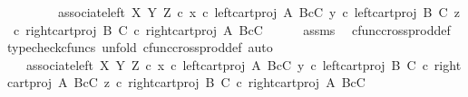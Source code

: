 \begin{isabellebody}
\ \ \ \ \ \ \ \ associate{\isacharunderscore}{\kern0pt}left\ X\ Y\ Z\ {\isasymcirc}\isactrlsub c\ {\isasymlangle}x\ {\isasymcirc}\isactrlsub c\ left{\isacharunderscore}{\kern0pt}cart{\isacharunderscore}{\kern0pt}proj\ A\ {\isacharparenleft}{\kern0pt}B{\isasymtimes}\isactrlsub cC{\isacharparenright}{\kern0pt}{\isacharcomma}{\kern0pt}\ {\isasymlangle}y\ {\isasymcirc}\isactrlsub c\ left{\isacharunderscore}{\kern0pt}cart{\isacharunderscore}{\kern0pt}proj\ B\ C{\isacharcomma}{\kern0pt}\ z\ {\isasymcirc}\isactrlsub c\ right{\isacharunderscore}{\kern0pt}cart{\isacharunderscore}{\kern0pt}proj\ B\ C{\isasymrangle}\ {\isasymcirc}\isactrlsub c\ right{\isacharunderscore}{\kern0pt}cart{\isacharunderscore}{\kern0pt}proj\ A\ {\isacharparenleft}{\kern0pt}B{\isasymtimes}\isactrlsub cC{\isacharparenright}{\kern0pt}{\isasymrangle}{\isachardoublequoteclose}\isanewline
\ \ \ \ \isamarkupfalse%
\ assms\ \isamarkupfalse%
\ cfunc{\isacharunderscore}{\kern0pt}cross{\isacharunderscore}{\kern0pt}prod{\isacharunderscore}{\kern0pt}def{}\ \isamarkupfalse%
{\isacharparenleft}{\kern0pt}typecheck{\isacharunderscore}{\kern0pt}cfuncs{\isacharcomma}{\kern0pt}\ unfold\ cfunc{\isacharunderscore}{\kern0pt}cross{\isacharunderscore}{\kern0pt}prod{\isacharunderscore}{\kern0pt}def{}{\isacharcomma}{\kern0pt}\ auto{\isacharparenright}{\kern0pt}\ \isanewline
\ \ \isamarkupfalse%
\ \isamarkupfalse%
\ {\isachardoublequoteopen}{\isachardot}{\kern0pt}{\isachardot}{\kern0pt}{\isachardot}{\kern0pt}\ {\isacharequal}{\kern0pt}\ associate{\isacharunderscore}{\kern0pt}left\ X\ Y\ Z\ {\isasymcirc}\isactrlsub c\ {\isasymlangle}x\ {\isasymcirc}\isactrlsub c\ left{\isacharunderscore}{\kern0pt}cart{\isacharunderscore}{\kern0pt}proj\ A\ {\isacharparenleft}{\kern0pt}B{\isasymtimes}\isactrlsub cC{\isacharparenright}{\kern0pt}{\isacharcomma}{\kern0pt}\ {\isasymlangle}y\ {\isasymcirc}\isactrlsub c\ left{\isacharunderscore}{\kern0pt}cart{\isacharunderscore}{\kern0pt}proj\ B\ C\ {\isasymcirc}\isactrlsub c\ right{\isacharunderscore}{\kern0pt}cart{\isacharunderscore}{\kern0pt}proj\ A\ {\isacharparenleft}{\kern0pt}B{\isasymtimes}\isactrlsub cC{\isacharparenright}{\kern0pt}{\isacharcomma}{\kern0pt}\ z\ {\isasymcirc}\isactrlsub c\ right{\isacharunderscore}{\kern0pt}cart{\isacharunderscore}{\kern0pt}proj\ B\ C\ {\isasymcirc}\isactrlsub c\ right{\isacharunderscore}{\kern0pt}cart{\isacharunderscore}{\kern0pt}proj\ A\ {\isacharparenleft}{\kern0pt}B{\isasymtimes}\isactrlsub cC{\isacharparenright}{\kern0pt}{\isasymrangle}{\isasymrangle}{\isachardoublequoteclose}\isanewline

\end{isabellebody}

